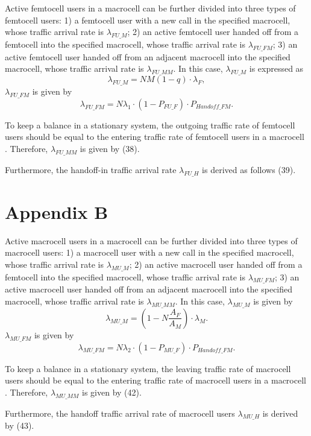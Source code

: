 \documentclass[10pt,final,journal,letterpaper,twoside,twocolumn]{IEEEtran}
\begin{document}
Active femtocell users in a macrocell can be further divided into three types of femtocell
users: 1) a femtocell user with a new call in the specified macrocell, whose traffic
arrival rate is ${\lambda _{FU\_M}}$; 2) an active femtocell user handed off
from a femtocell into the specified macrocell, whose traffic arrival rate is ${\lambda
_{FU\_FM}}$; 3) an active femtocell user handed off from an adjacent
macrocell into the specified macrocell, whose traffic arrival rate is ${\lambda
_{FU\_MM}}$. In this case, ${\lambda _{FU\_M}}$ is expressed as
\[{\lambda _{FU\_M}} = NM\left( {1 - q} \right) \cdot {\lambda _F},\tag{36}\]
${\lambda _{FU\_FM}}$ is given by
\[{\lambda _{FU\_FM}} = N{\lambda _1} \cdot \left( {1 - {P_{FU\_F}}} \right) \cdot {P_{Handoff\_FM}}.\tag{37}\]

To keep a balance in a stationary system, the outgoing traffic rate of
femtocell users should be equal to the entering traffic rate of femtocell
users in a macrocell \cite{Lin10}. Therefore, ${\lambda _{FU\_MM}}$ is given by (38).

Furthermore, the handoff-in traffic arrival rate ${\lambda _{FU\_H}}$ is
derived as follows (39).


\section*{Appendix B}
Active macrocell users in a macrocell can be further divided into three types of macrocell
users: 1) a macrocell user with a new call in the specified macrocell, whose traffic
arrival rate is ${\lambda _{MU\_M}}$; 2) an active macrocell user handed off
from a femtocell into the specified macrocell, whose traffic arrival rate is ${\lambda
_{MU\_FM}}$; 3) an active macrocell user handed off from an adjacent
macrocell into the specified macrocell, whose traffic arrival rate is ${\lambda
_{MU\_MM}}$. In this case, ${\lambda _{MU\_M}}$ is given by
\[{\lambda _{MU\_M}} = \left( {1 - N\frac{{{A_F}}}{{{A_M}}}} \right) \cdot {\lambda _M}.\tag{40}\]
${\lambda _{MU\_FM}}$ is given by
\[{\lambda _{MU\_FM}} = N{\lambda _2} \cdot \left( {1 - {P_{MU\_F}}} \right) \cdot {P_{Handoff\_FM}}.\tag{41}\]

To keep a balance in a stationary system, the leaving traffic rate of
macrocell users should be equal to the entering traffic rate of macrocell
users in a macrocell \cite{Lin10}. Therefore, ${\lambda _{MU\_MM}}$ is given by (42).

Furthermore, the handoff traffic arrival rate of macrocell users ${\lambda _{MU\_H}}$ is
derived by (43).
\end{document}
